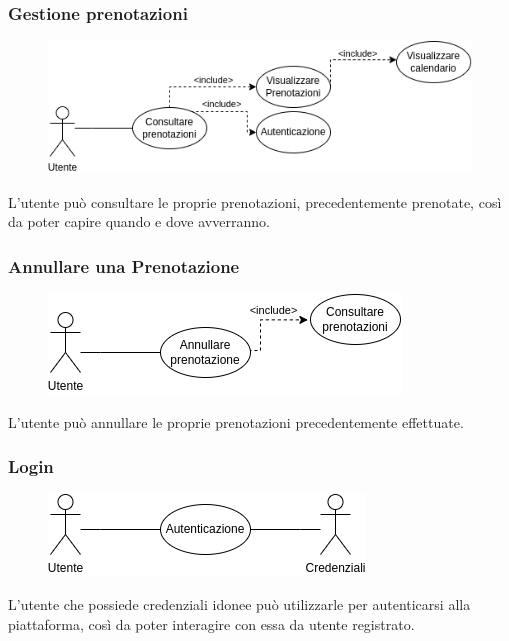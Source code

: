 \documentclass{article}
\begin{document}
\subsubsection{Gestione prenotazioni}\label{rf_3}
\begin{description}
	
	\begin{figure}[htp]
		\centering
		\includegraphics[width=\textwidth]{rf3.png}
	\end{figure}
	
	\item L'utente può consultare le proprie prenotazioni, precedentemente prenotate, così da poter capire quando e dove avverranno.
\end{description}

\subsubsection{Annullare una Prenotazione}\label{rf_4}
\begin{description}
	
	\begin{figure}[htp]
		\centering
		\includegraphics[]{rf4.png}
	\end{figure}
	
	\item L'utente può annullare le proprie prenotazioni precedentemente effettuate.
\end{description}


\subsubsection{Login}\label{rf_5}
\begin{description}
	
	\begin{figure}[htp]
		\centering
		\includegraphics[]{rf5.png}
	\end{figure}
	
	\item L'utente che possiede credenziali idonee può utilizzarle per autenticarsi alla piattaforma, così da poter interagire con essa da utente registrato.
\end{description}
\end{document}
